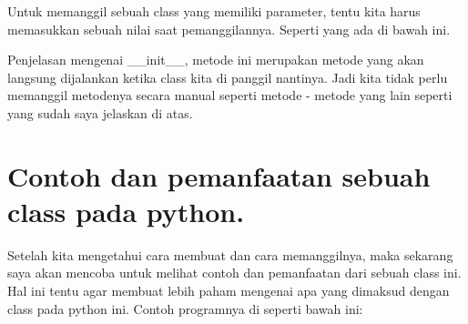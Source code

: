 
Untuk memanggil sebuah class yang memiliki parameter, tentu kita harus memasukkan sebuah nilai saat pemanggilannya. Seperti yang ada di bawah ini.

Penjelasan mengenai \_\_init\_\_, metode ini merupakan metode yang akan langsung dijalankan ketika class kita di panggil nantinya. Jadi kita tidak perlu memanggil metodenya secara manual seperti metode - metode yang lain seperti yang sudah saya jelaskan di atas.
\section{Contoh dan pemanfaatan sebuah class pada python.}
Setelah kita mengetahui cara membuat dan cara memanggilnya, maka sekarang saya akan mencoba untuk melihat contoh dan pemanfaatan dari sebuah class ini. Hal ini tentu agar membuat lebih paham mengenai apa yang dimaksud dengan class pada python ini. Contoh programnya di seperti bawah ini:

